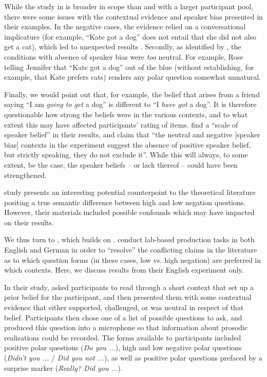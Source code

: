\documentclass[output=paper,colorlinks,citecolor=brown]{langscibook}
\begin{document}
While the study in \citet{roelofsen_positive_2012} is broader in scope than \citet{sailor_questionable1_2013} and with a larger participant pool, there were some issues with the contextual evidence and speaker bias presented in their examples. In the negative cases, the evidence relied on a conversational implicature (for example, ``Kate got a dog'' does not entail that she did not also get a cat), which led to unexpected results \citep[ 460]{roelofsen_positive_2012}. Secondly, as identified by \citet[ 6]{domaneschi_bias_2017}, the conditions with absence of speaker bias were \textit{too} neutral. For example, Rose telling Jennifer that ``Kate got a dog'' out of the blue (without establishing, for example, that Kate prefers cats) renders any polar question somewhat unnatural.

Finally, we would point out that, for example, the belief that arises from a friend saying ``I am \textit{going to get} a dog'' is different to ``I \textit{have got} a dog''. It is therefore questionable how strong the beliefs were in the various contexts, and to what extent this may have affected participants' rating of items. \citet[466]{roelofsen_positive_2012} find a ``scale of speaker belief'' in their results, and claim that ``the neutral and negative [speaker bias] contexts in the experiment suggest the absence of positive speaker belief, but strictly speaking, they do not exclude it''. While this will always, to some extent, be the case, the speaker beliefs -- or lack thereof -- could have been strengthened.

 study presents an interesting potential counterpoint to the theoretical literature positing a true semantic difference between high and low negation questions. However, their materials included possible confounds which may have impacted on their results.

We thus turn to \citet{domaneschi_bias_2017}, which builds on \citet{roelofsen_positive_2012}. \citet{domaneschi_bias_2017} conduct lab-based production tasks in both English and German in order to ``resolve'' the conflicting claims in the literature as to which question forms (in these cases, low vs. high negation) are preferred in which contexts. Here, we discuss results from their English experiment only.

In their study, \citet{domaneschi_bias_2017} asked participants to read through a short context that set up a prior belief for the participant, and then presented them with some contextual evidence that either supported, challenged, or was neutral in respect of that belief. Participants then chose one of a list of possible questions to ask, and produced this question into a microphone so that information about prosodic realisations could be recorded. The forms available to participants included positive polar questions (\textit{Do you ...}), high and low negative polar questions (\textit{Didn't you ...} / \textit{Did you not ...}), as well as positive polar questions prefaced by a surprise marker (\textit{Really? Did you ...}).
\end{document}
